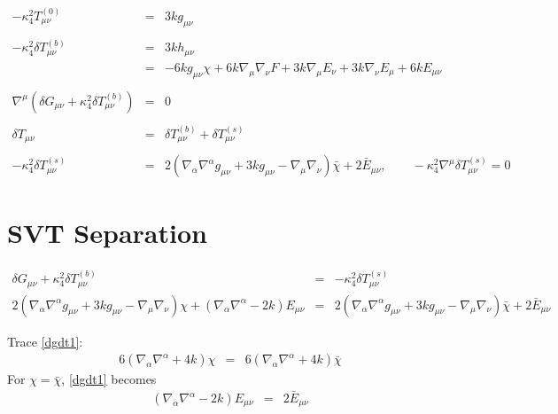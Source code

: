 \documentclass[10pt,letterpaper]{article}
\numberwithin{equation}{section}
\begin{document}
\begin{eqnarray}
-\kappa^2_4 T^{(0)}_{\mu\nu} &=& 3k g_{\mu\nu}
\nonumber\\ \nonumber\\
-\kappa^2_4 \delta T^{(b)}_{\mu\nu} &=& 3k h_{\mu\nu}
\nonumber\\ 
&=& -6kg_{\mu\nu}\chi +6k\nabla_\mu\nabla_\nu F + 3k\nabla_\mu E_\nu + 3k\nabla_\nu E_\mu + 6kE_{\mu\nu}
\nonumber\\ \nonumber\\
\nabla^\mu ( \delta G_{\mu\nu} + \kappa^2_4 \delta T_{\mu\nu}^{(b)}) &=& 0
\nonumber\\ \nonumber\\
\delta T_{\mu\nu} &=& \delta T_{\mu\nu}^{(b)}+\delta T_{\mu\nu}^{(s)}
\nonumber\\ \nonumber\\
-\kappa^2_4 \delta T_{\mu\nu}^{(s)} &=& 2\left( \nabla_\alpha\nabla^\alpha g_{\mu\nu} +3k g_{\mu\nu} - \nabla_\mu\nabla_\nu\right)\bar\chi + 2\bar E_{\mu\nu},\qquad -\kappa^2_4\nabla^\mu \delta T_{\mu\nu}^{(s)}=0
\end{eqnarray}

\section{SVT Separation}
\begin{eqnarray}
\delta G_{\mu\nu}+\kappa^2_4 \delta T_{\mu\nu}^{(b)}  &=& -\kappa^2_4 \delta T_{\mu\nu}^{(s)}
\nonumber\\
2\left( \nabla_\alpha\nabla^\alpha g_{\mu\nu} +3k g_{\mu\nu} - \nabla_\mu\nabla_\nu\right)\chi + (\nabla_\alpha\nabla^\alpha -2k) E_{\mu\nu}&=& 
2\left( \nabla_\alpha\nabla^\alpha g_{\mu\nu} +3k g_{\mu\nu} - \nabla_\mu\nabla_\nu\right)\bar\chi + 2\bar E_{\mu\nu}
\label{dgdt1}
\end{eqnarray}

Trace \eqref{dgdt1}:
\begin{eqnarray}
6(\nabla_\alpha\nabla^\alpha+4k)\chi &=& 6(\nabla_\alpha\nabla^\alpha+4k)\bar\chi
\end{eqnarray}
For $\chi=\bar\chi$, \eqref{dgdt1} becomes
\begin{eqnarray}
(\nabla_\alpha\nabla^\alpha -2k)E_{\mu\nu} &=& 2\bar E_{\mu\nu} 
\end{eqnarray}

\end{document}
